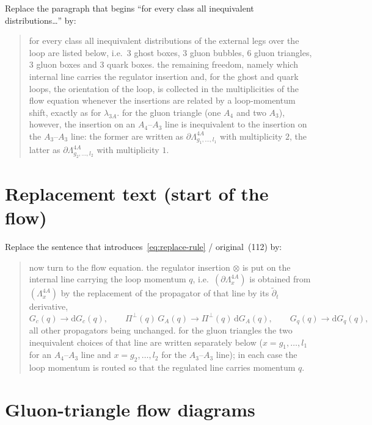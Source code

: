 \documentclass[11pt,a4paper]{article}
\begin{document}
Replace the paragraph that begins
``for every class all inequivalent distributions\ldots'' by:

\begin{quote}
\small
for every class all inequivalent distributions of the external legs over the
loop are listed below, i.e.\ 3 ghost boxes, 3 gluon bubbles, 6 gluon
triangles, 3 gluon boxes and 3 quark boxes. the remaining freedom, namely
which internal line carries the regulator insertion and, for the ghost and
quark loops, the orientation of the loop, is collected in the multiplicities
of the flow equation whenever the insertions are related by a loop-momentum
shift, exactly as for $\lambda_{3A}$. for the gluon triangle (one $A_4$ and
two $A_3$), however, the insertion on an $A_4$--$A_3$ line is inequivalent to
the insertion on the $A_3$--$A_3$ line: the former are written as
$\partial\Lambda^{4A}_{g_1,\ldots,l_1}$ with multiplicity $2$, the latter as
$\partial\Lambda^{4A}_{g_2,\ldots,l_2}$ with multiplicity $1$.
\end{quote}

\section{Replacement text (start of the flow)}

Replace the sentence that introduces~\eqref{eq:replace-rule} / original~(112)
by:

\begin{quote}
\small
now turn to the flow equation. the regulator insertion $\otimes$ is put on
the internal line carrying the loop momentum $q$, i.e.\
$(\partial\Lambda^{4A}_{x})$ is obtained from $(\Lambda^{4A}_{x})$ by the
replacement of the propagator of that line by its $\tilde{\partial}_t$
derivative,
\begin{equation}
  G_c(q)\to\mathrm{d}G_c(q),\qquad
  \Pi^\perp(q)\,G_A(q)\to\Pi^\perp(q)\,\mathrm{d}G_A(q),\qquad
  G_q(q)\to\mathrm{d}G_q(q),
  \label{eq:replace-rule}
\end{equation}
all other propagators being unchanged. for the gluon triangles the two
inequivalent choices of that line are written separately below
($x=g_1,\ldots,l_1$ for an $A_4$--$A_3$ line and $x=g_2,\ldots,l_2$ for the
$A_3$--$A_3$ line); in each case the loop momentum is routed so that the
regulated line carries momentum $q$.
\end{quote}

\section{Gluon-triangle flow diagrams}
\end{document}

